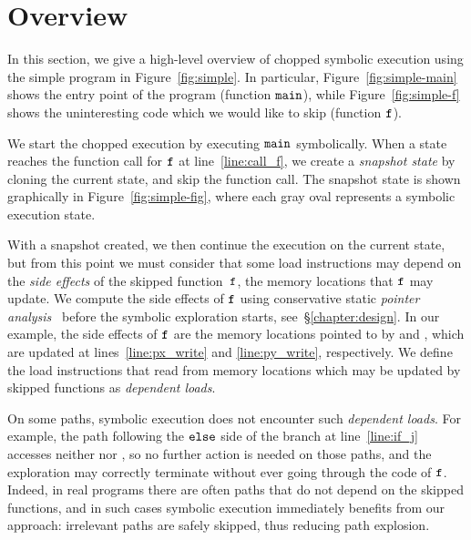 
\chapter{Overview}\label{chapter:overview}

In this section, we give a high-level overview of chopped symbolic
execution using the simple program in Figure~\ref{fig:simple}. In
particular, Figure~\ref{fig:simple-main} shows the entry point of the
program (function $\texttt{main}$), while Figure~\ref{fig:simple-f}
shows the uninteresting code which we would like to skip (function
$\texttt{f}$).

We start the chopped execution by executing $\texttt{main}$
symbolically. When a state reaches the function call for $\texttt{f}$ at
line~\ref{line:call_f}, we create a \textit{snapshot state} by cloning
the current state, and skip the function call. The snapshot state is
shown graphically in Figure~\ref{fig:simple-fig}, where each gray oval
represents a symbolic execution state.

With a snapshot created, we then continue the execution on the current
state, but from this point we must consider that some load
instructions may depend on the \textit{side effects} of the skipped
function~$\texttt{f}$, \ie the memory locations that $\texttt{f}$ may
update. 
We compute the side effects of $\texttt{f}$ using conservative static
\emph{pointer analysis}~\cite{andersen:pointeranalysis, Hind:Paste2001, Smaragdakis:FTPL2015} 
before the symbolic exploration starts, see~\S\ref{chapter:design}.
In our example, the side effects of $\texttt{f}$ are the memory
locations pointed to by  and , which are updated
at lines~\ref{line:px_write} and \ref{line:py_write}, respectively.
We define the load instructions that read from memory locations 
which may be updated by skipped functions as \textit{dependent loads}.

On some paths, symbolic execution does not encounter such
\textit{dependent loads}. For example, the path following the
$\texttt{else}$ side of the branch at line~\ref{line:if_j} accesses
neither  nor , so no further action is needed on
those paths, and the exploration may correctly terminate without ever
going through the code of $\texttt{f}$. Indeed, in real programs there
are often paths that do not depend on the skipped functions, and in
such cases symbolic execution immediately benefits from our approach:
irrelevant paths are safely skipped, thus reducing path explosion.

